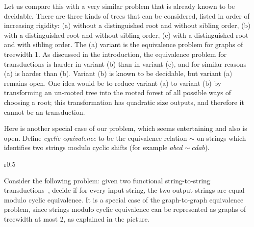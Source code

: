     Let us compare this 
    with a very similar problem that is already known to be decidable. There are three kinds of trees that can be considered, listed in order of increasing rigidity: (a) without a distinguished root and without sibling order, (b)  with a distinguished root and without sibling order, (c) with a distinguished root and with sibling order. The (a) variant is the 
    equivalence
    problem
    for graphs of treewidth 1.  As discussed in the introduction, the equivalence problem for \mso transductions is harder in  variant (b) than in variant (c), and for similar reasons (a) is harder than (b). Variant (b) is known to be decidable, but variant (a) remains open.  One idea would be to reduce variant (a) to variant (b) by transforming an  un-rooted tree into the rooted forest of all possible ways of choosing a root; 
    this transformation has quadratic size outputs, and therefore it cannot be an \mso transduction.

     Here is another special case of our problem, which seems entertaining and also is open.
        Define \emph{cyclic equivalence} to be the equivalence relation $\sim$ on strings which identifies two strings modulo cyclic shifts (for example $abcd \sim cdab$).
         \begin{wrapfigure}{r}{0.5\textwidth}
         \end{wrapfigure}
         Consider the following  problem: given two functional string-to-string \mso transductions~\cite[Definition 1]{engelfrietMSODefinableString2001},
        decide if for every input string, the two output strings are equal  modulo cyclic equivalence. %
         It is a special case of the graph-to-graph equivalence problem, since  strings modulo cyclic equivalence  can be represented as graphs of treewidth at most 2, as explained in the  picture.


        
